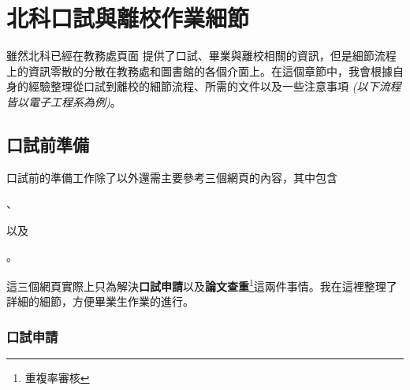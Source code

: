 \documentclass[12pt]{report}
\theoremstyle{plain}
\begin{document}
\chapter{北科口試與離校作業細節}

雖然北科已經在教務處頁面 \cite{ntutfinal} 提供了口試、畢業與離校相關的資訊，但是細節流程上的資訊零散的分散在教務處和圖書館的各個介面上。在這個章節中，我會根據自身的經驗整理從口試到離校的細節流程、所需的文件以及一些注意事項 \textit{(以下流程皆以電子工程系為例)}。

\section{口試前準備}

口試前的準備工作除了\cite{ntutfinal}以外還需主要參考三個網頁的內容，其中包含
\begin{enumerate*}
    \item {} \cite{ntutsheet}、
    \item {} \cite{ntutlibgraduate} 以及
    \item {} \cite{ntutlibupdate}。
\end{enumerate*}
這三個網頁實際上只為解決\textbf{口試申請}以及\textbf{論文查重}\footnote{重複率審核}這兩件事情。我在這裡整理了詳細的細節，方便畢業生作業的進行。

\subsection{口試申請}
\end{document}
